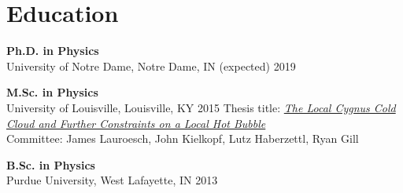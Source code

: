 
\section*{Education}



\LeftRight
{
	\textbf{Ph.D. in Physics}\\
	University of Notre Dame, Notre Dame, IN
}
{
	(expected) 2019
}

\smallskip
\LeftRight
{
	\textbf{M.Sc. in Physics}\\
	University of Louisville, Louisville, KY
}
{
	2015
}
\indent
	Thesis title: \textit{\href{http://github.com/glentner/MastersThesis}
	{The Local Cygnus Cold Cloud and Further Constraints on a Local Hot Bubble}}\\
\indent
	Committee: James Lauroesch, John Kielkopf, Lutz Haberzettl, Ryan Gill


\smallskip
\LeftRight
{
	\textbf{B.Sc. in Physics}\\
	Purdue University, West Lafayette, IN
}
{
	2013
}

\bigskip
